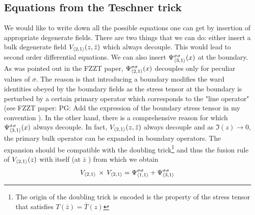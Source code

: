\documentclass[a4paper]{article}
\newcommand{\purple}[1]{{\color{purple} #1 \color{black}}}
\newcommand{\PG}[1]{{\purple{PG: #1}}} %
\begin{document}
\subsection{Equations from the Teschner trick}
We would like to write down all the possible equations one can get by insertion of appropriate degenerate fields. There are two things that we can do: either insert a bulk degenerate field $V_{\braket{2,1}}(z,\bar{z})$ which always decouple. This would lead to second order differential equations. We can also insert $\Psi_{\braket{3,1}}^{\sigma \sigma}(x)$ at the boundary. As was pointed out in the FZZT paper, $\Psi_{\braket{2,1}}^{\sigma \sigma}(x)$ decouples only for peculiar values of $\sigma$. The reason is that introducing a boundary modifies the ward identities obeyed by the boundary fields as the stress tensor at the boundary is perturbed by a certain primary operator which corresponds to the "line operator" (see FZZT paper: \PG{Add the expression of the boundary stress tensor in my convention}). In the other hand, there is a comprehensive reason for which $\Psi_{\braket{3,1}}^{\sigma \sigma}(x)$ always decouple. In fact, $V_{\braket{2,1}}(z,\bar{z})$ always decouple and as $\Im (z)\to 0$, the primary bulk operator can be expanded in boundary operators. The expansion should be compatible with the doubling trick\footnote{The origin of the doubling trick is encoded is the property of the stress tensor that satisfies $T(\bar{z})=\bar{T}(z)$} and thus the fusion rule of $V_{\braket{2,1}}(z)$ with itself (at $\bar{z}$ ) from which we obtain
\begin{equation}
  V_{\braket{2,1}}\,\times\,V_{\braket{2,1}} = \Psi_{\braket{1,1}}^{\sigma \sigma} + \Psi_{\braket{3,1}}^{\sigma \sigma}
\end{equation}
\end{document}
